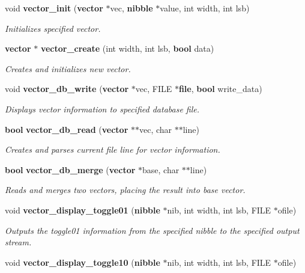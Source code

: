 \begin{CompactItemize}
\item 
void {\bf vector\_\-init} ({\bf vector} $\ast$vec, {\bf nibble} $\ast$value, int width, int lsb)
\begin{CompactList}\small\item\em Initializes specified vector.\item\end{CompactList}\item 
{\bf vector} $\ast$ {\bf vector\_\-create} (int width, int lsb, {\bf bool} data)
\begin{CompactList}\small\item\em Creates and initializes new vector.\item\end{CompactList}\item 
void {\bf vector\_\-db\_\-write} ({\bf vector} $\ast$vec, FILE $\ast${\bf file}, {\bf bool} write\_\-data)
\begin{CompactList}\small\item\em Displays vector information to specified database file.\item\end{CompactList}\item 
{\bf bool} {\bf vector\_\-db\_\-read} ({\bf vector} $\ast$$\ast$vec, char $\ast$$\ast$line)
\begin{CompactList}\small\item\em Creates and parses current file line for vector information.\item\end{CompactList}\item 
{\bf bool} {\bf vector\_\-db\_\-merge} ({\bf vector} $\ast$base, char $\ast$$\ast$line)
\begin{CompactList}\small\item\em Reads and merges two vectors, placing the result into base vector.\item\end{CompactList}\item 
void {\bf vector\_\-display\_\-toggle01} ({\bf nibble} $\ast$nib, int width, int lsb, FILE $\ast$ofile)
\begin{CompactList}\small\item\em Outputs the toggle01 information from the specified nibble to the specified output stream.\item\end{CompactList}\item 
void {\bf vector\_\-display\_\-toggle10} ({\bf nibble} $\ast$nib, int width, int lsb, FILE $\ast$ofile)
$$
\end{CompactItemize}
